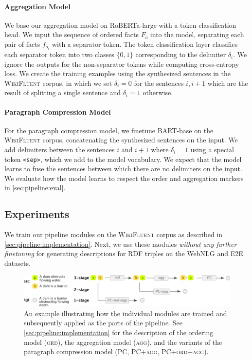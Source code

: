 \paragraph{Aggregation Model}
We base our aggregation model on RoBERTa-large \cite{liuRoBERTaRobustlyOptimized2019} with a token classification head. We input the sequence of ordered facts $F_o$ into the model, separating each pair of facts $f_{o_i}$ with a separator token. The token classification layer classifies each separator token into two classes $\{0,1\}$ corresponding to the delimiter $\delta_i$. We ignore the outputs for the non-separator tokens while computing cross-entropy loss. We create the training examples using the synthesized sentences in the \textsc{WikiFluent} corpus, in which we set $\delta_i=0$ for the sentences $i,i+1$ which are the result of splitting a single sentence and $\delta_i=1$ otherwise.

\paragraph{Paragraph Compression Model} For the paragraph compression model, we finetune BART-base \cite{lewisBARTDenoisingSequencetoSequence2019} on the \textsc{WikiFluent} corpus, concatenating the synthesized sentences on the input. We add delimiters between the sentences $i$ and $i+1$ where $\delta_i=1$ using a special token \texttt{<sep>}, which we add to the model vocabulary. We expect that the model learns to fuse the sentences between which there are no delimiters on the input. We evaluate how the model learns to respect the order and aggregation markers in \autoref{sec:pipeline:eval}.


\subsection{Experiments}
\label{sec:pipeline:experiments}
We train our pipeline modules on the \textsc{WikiFluent} corpus as described in \autoref{sec:pipeline:implementation}. Next, we use these modules \textit{without any further finetuning} for generating descriptions for RDF triples on the WebNLG and E2E datasets.


\begin{figure}[t]
    \centering
    \includegraphics[width=\textwidth]{img/pipeline-variants.pdf}

    \caption[Pipeline variants.]{An example illustrating how the individual modules are trained and subsequently applied as the parts of the pipeline. See \autoref{sec:pipeline:implementation} for the description of the ordering model (\textsc{ord}), the aggregation model (\textsc{agg}), and the variants of the paragraph compression model (\textsc{PC, PC+agg, PC+ord+agg}).}
    \label{fig:pipeline:variants}
\end{figure}


